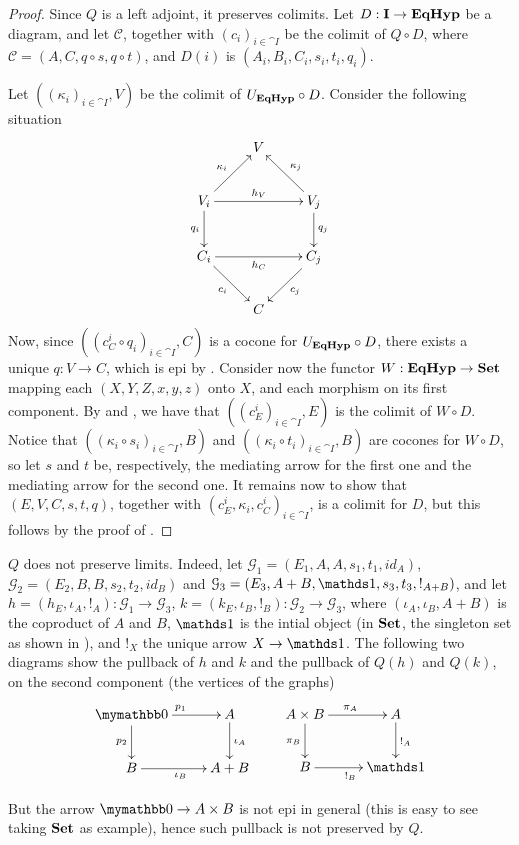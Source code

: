 \begin{proof}
    Since $Q$ is a left adjoint, it preserves colimits.
	Let $D: \mathbf{I} \to \textbf{\textup{EqHyp}}$ be a diagram, and let $\mathcal{C}$, together with  $(c_i)_{i\in \cat I}$ be the colimit of $Q \circ D$, where $\mathcal{C} = (A, C, q\circ s, q\circ t)$, and $D(i)$ is $(A_i, B_i, C_i, s_i, t_i, q_i)$.
	\iffalse
	Let now $T: \EqHyp \to \Set$ be the functor mapping each graph with equivalence onto its second component, $T((X, Y, Z, x, y, z)) = Y$, and each morphims onto its second component.\fi
	Let $((\kappa_i)_{i\in \cat I}, V)$ be the colimit of $U_{\textbf{\textup{EqHyp}}} \circ D$.
	Consider the following situation
	\[\xymatrix{
								  &  {V} &                             \\
		V_i \ar[ur]^{\kappa_i} \ar[rr]^{h_V} \ar[d]_{q_i} && V_j \ar[ul]_{\kappa_j} \ar[d]^{q_j}\\
		C_i \ar[dr]_{c_i}      \ar[rr]_{h_C}              &&C_j  \ar[dl]^{c_j}                  \\
								  &  {C} &
	}\]
	Now, since $((c^i_C \circ q_i)_{i \in \cat I}, C)$ is a cocone for $U_{\textbf{\textup{EqHyp}}} \circ D$, there exists a unique $q: V \to C$, which is epi by .
	Consider now the functor $W: \textbf{\textup{EqHyp}} \to \mathbf{Set}$ mapping each $(X, Y, Z, x, y, z)$ onto $X$, and each morphism on its first component.
	By  and , we have that $((c_E^i)_{i \in \cat I}, E)$ is the colimit of $W \circ D$.
	Notice that $((\kappa_i \circ s_i)_{i \in \cat{I}}, B)$ and $((\kappa_i \circ t_i)_{i \in \cat I}, B)$ are cocones for $W \circ D$, so let $s$ and $t$ be, respectively, the mediating arrow for the first one and the mediating arrow for the second one. It remains now to show that $(E, V, C, s, t, q)$, together with $(c_E^i, \kappa_i, c_C^i)_{i \in \cat I}$, is a colimit for $D$, but this follows by the proof of .
\end{proof}

\begin{example}
	$Q$ does not preserve limits. Indeed, let $\mathcal{G}_1 = (E_1, A, A, s_1, t_1, id_A)$, $\mathcal{G}_2 = (E_2, B, B, s_2, t_2, id_B)$ and $\mathcal{G}_3 = (E_3, A + B, \terminal, s_3, t_3, !_{A + B})$, and let $h = (h_E, \iota_A, !_A): \mathcal{G}_1 \to \mathcal{G}_3$, $k = (k_E, \iota_B, !_B): \mathcal{G}_2 \to \mathcal{G}_3$, where $(\iota_A, \iota_B, A + B)$ is the coproduct of $A$ and $B$, $\terminal$ is the intial object (in $\mathbf{Set}$, the singleton set as shown in ), and $!_X$ the unique arrow $X \to \terminal$.
	The following two diagrams show the pullback of $h$ and $k$ and the pullback of $Q(h)$ and $Q(k)$, on the second component (the vertices of the graphs)
	\[\xymatrix{
			\initial \ar[r]^{p_1} \ar[d]_{p_2}& A \ar[d]^{\iota_A} \\
			B \ar[r]_{\iota_B} & A+B
	}
	\qquad
	\xymatrix{
		{A \times B} \ar[r]^{\pi_A} \ar[d]_{\pi_B} & A \ar[d]^{!_A} \\
		B \ar[r]_{!_B} & \terminal
	}\]

	But the arrow $\initial \to A \times B$ is not epi in general (this is easy to see taking $\mathbf{Set}$ as example), hence such pullback is not preserved by $Q$.
\end{example}

